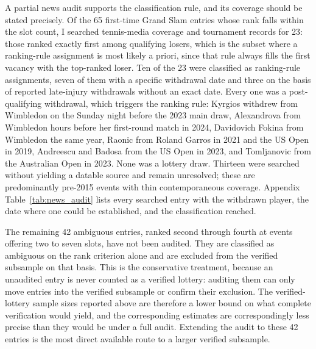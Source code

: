 A partial news audit supports the classification rule, and its coverage should be stated precisely. Of the 65 first-time Grand Slam entries whose rank falls within the slot count, I searched tennis-media coverage and tournament records for 23: those ranked exactly first among qualifying losers, which is the subset where a ranking-rule assignment is most likely a priori, since that rule always fills the first vacancy with the top-ranked loser. Ten of the 23 were classified as ranking-rule assignments, seven of them with a specific withdrawal date and three on the basis of reported late-injury withdrawals without an exact date. Every one was a post-qualifying withdrawal, which triggers the ranking rule: Kyrgios withdrew from Wimbledon on the Sunday night before the 2023 main draw, Alexandrova from Wimbledon hours before her first-round match in 2024, Davidovich Fokina from Wimbledon the same year, Raonic from Roland Garros in 2021 and the US Open in 2019, Andreescu and Badosa from the US Open in 2023, and Tomljanovic from the Australian Open in 2023. None was a lottery draw. Thirteen were searched without yielding a datable source and remain unresolved; these are predominantly pre-2015 events with thin contemporaneous coverage. Appendix Table~\ref{tab:news_audit} lists every searched entry with the withdrawn player, the date where one could be established, and the classification reached.

The remaining 42 ambiguous entries, ranked second through fourth at events offering two to seven slots, have not been audited. They are classified as ambiguous on the rank criterion alone and are excluded from the verified subsample on that basis. This is the conservative treatment, because an unaudited entry is never counted as a verified lottery: auditing them can only move entries into the verified subsample or confirm their exclusion. The verified-lottery sample sizes reported above are therefore a lower bound on what complete verification would yield, and the corresponding estimates are correspondingly less precise than they would be under a full audit. Extending the audit to these 42 entries is the most direct available route to a larger verified subsample.

